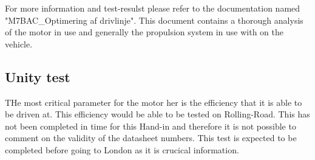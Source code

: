 For more information and test-resulst please refer to the documentation named "M7BAC\_Optimering af drivlinje". This document contains a thorough analysis of the motor in use and generally the propulsion system in use with on the vehicle.  

\subsection{Unity test}
THe most critical parameter for the motor her is the efficiency that it is able to be driven at. This efficiency would be able to be tested on Rolling-Road. This has not been completed in time for this Hand-in and therefore it is not possible to comment on the validity of the datasheet numbers. This test is expected to be completed before going to London as it is crucical information. 